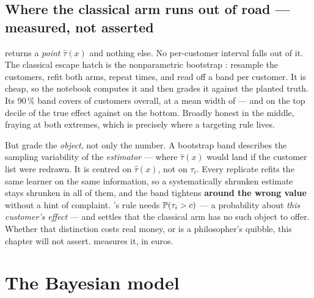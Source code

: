 \subsection*{Where the classical arm runs out of road --- measured, not asserted}

 returns a \emph{point} $\hat\tau(x)$ and nothing else. No per-customer
interval falls out of it. The classical escape hatch is the nonparametric bootstrap
\citep{efron1979}: resample the customers, refit both arms, repeat \nbOneNBootCate{} times, and
read off a band per customer. It is cheap, so the notebook computes it and then grades it against
the planted truth. Its 90\,\% band covers \pc{\nbOneBootCov} of customers overall, at a mean width
of \eur{\nbOneBootWidth} --- and \pc{\nbOneBootTopDec} on the top decile of the true effect
against \pc{\nbOneBootBotDec} on the bottom. Broadly honest in the middle, fraying at both
extremes, which is precisely where a targeting rule lives.

But grade the \emph{object}, not only the number. A bootstrap band describes the sampling
variability of the \emph{estimator} --- where $\hat\tau(x)$ would land if the customer list were
redrawn. It is centred on $\hat\tau(x)$, not on $\tau_i$. Every replicate refits the same learner
on the same information, so a systematically shrunken estimate stays shrunken in all
\nbOneNBootCate{} of them, and the band tightens \textbf{around the wrong value} without a hint of
complaint. 's rule needs $\operatorname{\mathbb{P}}(\tau_i > c)$ --- a probability about
\emph{this customer's effect} --- and  settles that the classical arm has no
such object to offer. Whether that distinction costs real money, or is a philosopher's quibble,
this chapter will not assert.  measures it, in euros.

\section{The Bayesian model}
\label{sec:up:bayes}

